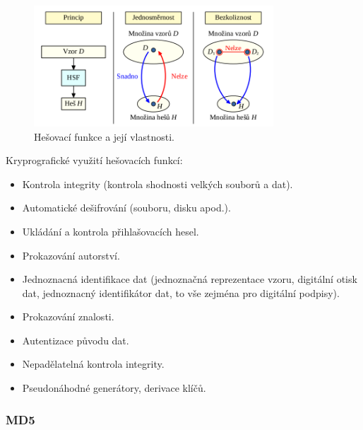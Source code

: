 \begin{figure}[!ht]
	\centering
 	\includegraphics[width=0.8\textwidth, angle=0]{hesla-has.png}
 	\caption[Hesla hešovací funkce]{Hešovací funkce a její vlastnosti.}\label{fig:has}
\end{figure}
 
Kryprografické využití hešovacích funkcí:
 
\begin{itemize}
\item Kontrola integrity (kontrola shodnosti velkých souborů a dat).
\item Automatické dešifrování (souboru, disku apod.).
\item Ukládání a kontrola přihlašovacích hesel. 
\item Prokazování autorství.
\item Jednoznacná identifikace dat (jednoznačná reprezentace vzoru, digitální otisk dat, jednoznacný identifikátor dat, to vše zejména pro digitální podpisy).
\item Prokazování znalosti.
\item Autentizace původu dat.
\item Nepadělatelná kontrola integrity.
\item Pseudonáhodné generátory, derivace klíčů.
\end{itemize}

\subsubsection{MD5}



